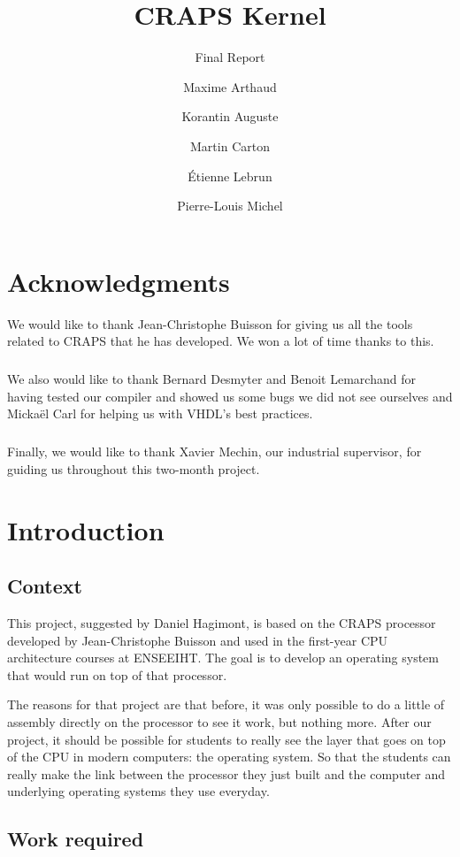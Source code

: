 \documentclass[openany]{book}
\title{CRAPS Kernel}
\subtitle{Final Report}
\author{
       Maxime Arthaud
  \and Korantin Auguste
  \and Martin Carton
  \and Étienne Lebrun
  \and Pierre-Louis Michel
}
\begin{document}
  

  \chapter*{Acknowledgments}
    We would like to thank Jean-Christophe Buisson for giving us all the tools
    related to CRAPS that he has developed. We won a lot of time thanks to this.

    \paragraph{}
    We also would like to thank Bernard Desmyter and Benoit Lemarchand for
    having tested our compiler and showed us some bugs we did not see ourselves
    and Mickaël Carl for helping us with VHDL's best practices.

    \paragraph{}
    Finally, we would like to thank Xavier Mechin, our industrial supervisor,
    for guiding us throughout this two-month project.

  \tableofcontents

  \chapter{Introduction}
    \section{Context}
      This project, suggested by Daniel Hagimont, is based on the CRAPS
      processor developed by Jean-Christophe Buisson and used in the first-year
      CPU architecture courses at ENSEEIHT. The goal is to develop an operating
      system that would run on top of that processor.

      The reasons for that project are that before, it was only possible to do a
      little of assembly directly on the processor to see it work, but nothing
      more.  After our project, it should be possible for students to really see
      the layer that goes on top of the CPU in modern computers: the operating
      system. So that the students can really make the link between the
      processor they just built and the computer and underlying operating
      systems they use everyday.

    \section{Work required}
\end{document}
